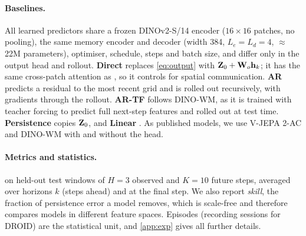 \paragraph{Baselines.} All learned predictors share a frozen DINOv2-S/14 encoder ($16{\times}16$ patches, no pooling),
the same memory encoder and decoder (width 384, $L_e{=}L_d{=}4$, $\approx$22M parameters), optimiser, schedule, steps and
batch size, and differ only in the output head and rollout.
%
\textbf{Direct} replaces \cref{eq:output} with $\mathbf{Z}_0+\mathbf{W}_o\mathbf{h}_k$; it has the same cross-patch attention as
\ours{}, so it controls for spatial communication.
%
\textbf{AR} predicts a residual to the most recent grid and is rolled out recursively, with gradients through the
rollout.
%
\textbf{AR-TF} follows DINO-WM, as it is trained with teacher forcing to predict full next-step features and rolled out at
test time.
%
\textbf{Persistence} copies $\mathbf{Z}_0$, and \textbf{Linear} .
%
As published models, we use V-JEPA 2-AC and DINO-WM with and without the \ours{} head.

\paragraph{Metrics and statistics.}  on held-out test windows of $H{=}3$
observed and $K{=}10$ future steps, averaged over horizons $k$ (steps ahead) and at the final step.
%
We also report \emph{skill}, the fraction of persistence error a model removes, which is scale-free and therefore
compares models in different feature spaces.
%
Episodes (recording sessions for DROID) are the statistical unit, and \cref{app:exp} gives all further details.
